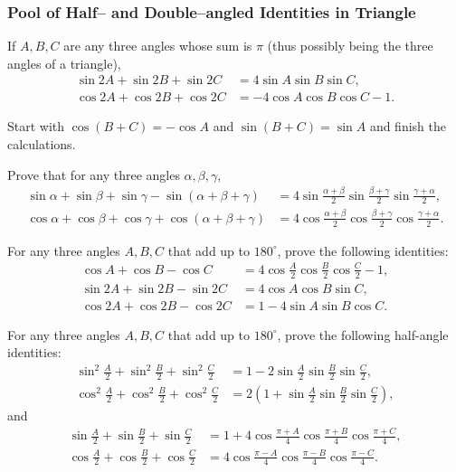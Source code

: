 \documentclass[12pt,a4paper]{memoir}
\theoremstyle{definition}
\begin{document}
\subsubsection{Pool of Half-- and Double--angled Identities in Triangle}
\begin{question}
	\label{q:sin2A+sin2B+sin2C}
	If $A, B, C$ are any three angles whose sum is $\pi$ (thus possibly being the three angles of a triangle),
	\begin{align}
		\sin 2A + \sin 2B + \sin 2C &= 4 \sin A \sin B \sin C,\\
		\cos 2A + \cos 2B + \cos 2C &=-4\cos A \cos B \cos C - 1.
	\end{align}
\end{question}
\begin{solution}
	Start with $\cos(B+C)=-\cos A$ and $\sin(B+C)=\sin A$ and finish the calculations.
\end{solution}

\begin{question}
	Prove that for any three angles $\alpha,\beta,\gamma$,
	\begin{align*}
		\sin \alpha + \sin \beta + \sin \gamma - \sin(\alpha+\beta+\gamma) &= 4\sin\frac{\alpha+\beta}{2}\sin\frac{\beta+\gamma}{2}\sin\frac{\gamma+\alpha}{2},\\
		\cos \alpha + \cos \beta + \cos \gamma + \cos(\alpha+\beta+\gamma) &= 4\cos\frac{\alpha+\beta}{2}\cos\frac{\beta+\gamma}{2}\cos\frac{\gamma+\alpha}{2}.
	\end{align*}
\end{question}


\begin{question}
	For any three angles $A,B,C$ that add up to $180^\circ$, prove the following identities:
	\begin{align*}
		\cos A + \cos B - \cos C &= 4\cos \frac{A}{2}\cos \frac{B}{2}\cos \frac{C}{2}-1,\\
		\sin 2A +\sin 2B - \sin 2C &= 4\cos A \cos B \sin C,\\
		\cos 2A +\cos 2B - \cos 2C &= 1 - 4\sin A \sin B \cos C.
	\end{align*}
\end{question}


\begin{question}
	For any three angles $A,B,C$ that add up to $180^\circ$, prove the following half-angle identities:
	\begin{align*}
		\sin^2 \frac{A}{2} + \sin^2 \frac{B}{2} + \sin^2 \frac{C}{2} &= 1 - 2\sin\frac{A}{2}\sin\frac{B}{2}\sin\frac{C}{2},\\
		\cos^2 \frac{A}{2} + \cos^2 \frac{B}{2} + \cos^2 \frac{C}{2} &= 2\left(1 + \sin\frac{A}{2}\sin\frac{B}{2}\sin\frac{C}{2}\right),
	\end{align*}
	and
	\begin{align*}
		\sin \frac{A}{2} + \sin \frac{B}{2} + \sin \frac{C}{2} &= 1 + 4 \cos\frac{\pi+A}{4}\cos\frac{\pi+B}{4}\cos\frac{\pi+C}{4},\\
		\cos \frac{A}{2} + \cos \frac{B}{2} + \cos \frac{C}{2} &= 4\cos\frac{\pi-A}{4}\cos\frac{\pi-B}{4}\cos\frac{\pi-C}{4}.
	\end{align*}
\end{question}
\end{document}

